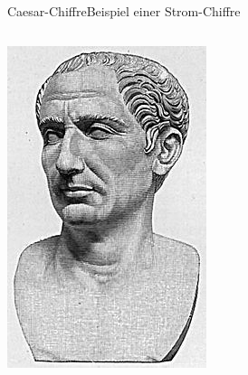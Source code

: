 \documentclass{beamer}
\theoremstyle{plain}
\begin{document}
\begin{frame}{Caesar-Chiffre}{Beispiel einer Strom-Chiffre}
\begin{columns}[T]
 \begin{column}{0.3\textwidth}
  \includegraphics[width=\textwidth]{caesar}
 \end{column}
 \end{columns}
\end{frame}
\end{document}
